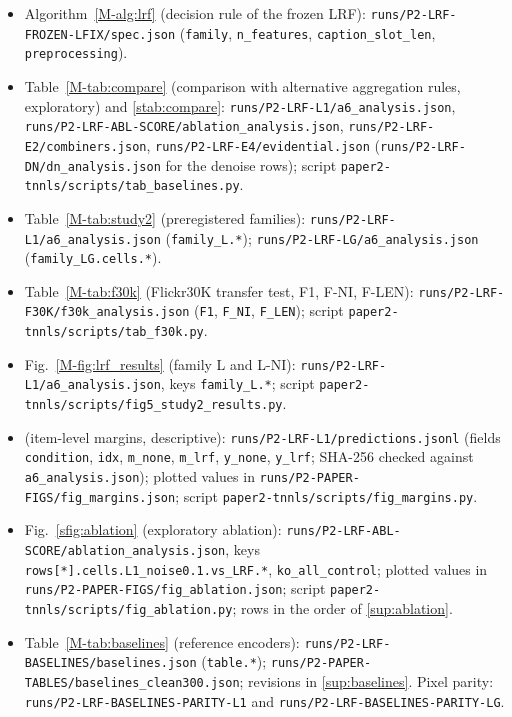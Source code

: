 \documentclass[journal,onecolumn]{IEEEtran}
\theoremstyle{plain}
\begin{document}
\begin{itemize}
image 224724: Attribution-NonCommercial (CC BY-NC 2.0), \nolinkurl{http://farm4.staticflickr.com/3543/3544616491_7cdec47006_z.jpg}
(record: \nolinkurl{runs/P2-PAPER-FIGS/fig_qualitative_licences.json}).
\item Algorithm~\ref{M-alg:lrf} (decision rule of the frozen LRF): \nolinkurl{runs/P2-LRF-FROZEN-LFIX/spec.json} (\nolinkurl{family}, \nolinkurl{n_features}, \nolinkurl{caption_slot_len}, \nolinkurl{preprocessing}).
\item Table~\ref{M-tab:compare} (comparison with alternative aggregation rules, exploratory) and \cref{stab:compare}: \nolinkurl{runs/P2-LRF-L1/a6_analysis.json}, \nolinkurl{runs/P2-LRF-ABL-SCORE/ablation_analysis.json}, \nolinkurl{runs/P2-LRF-E2/combiners.json}, \nolinkurl{runs/P2-LRF-E4/evidential.json}
(\nolinkurl{runs/P2-LRF-DN/dn_analysis.json} for the denoise rows); script \nolinkurl{paper2-tnnls/scripts/tab_baselines.py}.
\item Table~\ref{M-tab:study2} (preregistered families): \nolinkurl{runs/P2-LRF-L1/a6_analysis.json} (\nolinkurl{family_L.*});
\nolinkurl{runs/P2-LRF-LG/a6_analysis.json} (\nolinkurl{family_LG.cells.*}).
\item Table~\ref{M-tab:f30k} (Flickr30K transfer test, F1, F-NI, F-LEN): \nolinkurl{runs/P2-LRF-F30K/f30k_analysis.json} (\nolinkurl{F1}, \nolinkurl{F_NI}, \nolinkurl{F_LEN}); script \nolinkurl{paper2-tnnls/scripts/tab_f30k.py}.
\item Fig.~\ref{M-fig:lrf_results} (family L and L-NI): \nolinkurl{runs/P2-LRF-L1/a6_analysis.json}, keys \nolinkurl{family_L.*}; script
\nolinkurl{paper2-tnnls/scripts/fig5_study2_results.py}.
\item {} (item-level margins, descriptive): \nolinkurl{runs/P2-LRF-L1/predictions.jsonl} (fields \nolinkurl{condition},
\nolinkurl{idx}, \nolinkurl{m_none}, \nolinkurl{m_lrf}, \nolinkurl{y_none}, \nolinkurl{y_lrf}; SHA-256 checked against \nolinkurl{a6_analysis.json});
plotted values in \nolinkurl{runs/P2-PAPER-FIGS/fig_margins.json}; script \nolinkurl{paper2-tnnls/scripts/fig_margins.py}.
\item Fig.~\ref{sfig:ablation} (exploratory ablation): \nolinkurl{runs/P2-LRF-ABL-SCORE/ablation_analysis.json}, keys
\nolinkurl{rows[*].cells.L1_noise0.1.vs_LRF.*}, \nolinkurl{ko_all_control}; plotted values in \nolinkurl{runs/P2-PAPER-FIGS/fig_ablation.json};
script \nolinkurl{paper2-tnnls/scripts/fig_ablation.py}; rows in the order of \cref{sup:ablation}.
\item Table~\ref{M-tab:baselines} (reference encoders): \nolinkurl{runs/P2-LRF-BASELINES/baselines.json} (\nolinkurl{table.*});
\nolinkurl{runs/P2-PAPER-TABLES/baselines_clean300.json}; revisions in \cref{sup:baselines}.\newline
Pixel parity: \nolinkurl{runs/P2-LRF-BASELINES-PARITY-L1} and \nolinkurl{runs/P2-LRF-BASELINES-PARITY-LG}.
\end{itemize}
\end{document}
